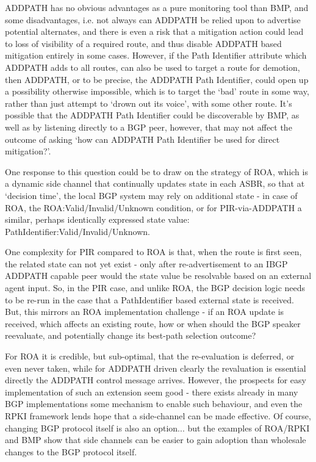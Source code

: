 ADDPATH has no obvious advantages as a pure monitoring tool than BMP, and some disadvantages, i.e. not always can ADDPATH be relied upon to advertise potential alternates, and there is even a risk that a mitigation action could lead to loss of visibility of a required route, and thus disable ADDPATH based mitigation entirely in some cases.  However, if the Path Identifier attribute which ADDPATH adds to all routes, can also be used to target a route for demotion, then ADDPATH, or to be precise, the ADDPATH Path Identifier, could open up a possibility otherwise impossible, which is to target the `bad' route in some way, rather than just attempt to `drown out its voice', with some other route.  It's possible that the ADDPATH Path Identifier could be discoverable by BMP, as well as by listening directly to a BGP peer, however, that may not affect the outcome of asking `how can ADDPATH Path Identifier be used for direct mitigation?'.

One response to this question could be to draw on the strategy of ROA, which is a dynamic side channel that continually updates state in each ASBR, so that at `decision time', the local BGP system may rely on additional state - in case of ROA, the ROA:Valid/Invalid/Unknown condition, or for PIR-via-ADDPATH a similar, perhaps identically expressed state value: PathIdentifier:Valid/Invalid/Unknown.

One complexity for PIR compared to ROA is that, when the route is first seen, the related state can not yet exist - only after re-advertisement to an IBGP ADDPATH capable peer would the state value be resolvable based on an external agent input.  So, in the PIR case, and unlike ROA, the BGP decision logic needs to be re-run in the case that a PathIdentifier based external state is received.  But, this mirrors an ROA implementation challenge - if an ROA update is received, which affects an existing route, how or when should the BGP speaker reevaluate, and potentially change its best-path selection outcome?

For ROA it is credible, but sub-optimal, that the re-evaluation is deferred, or even never taken, while for ADDPATH driven clearly the revaluation is essential directly the ADDPATH control message arrives.  However, the prospects for easy implementation of such an extension seem good - there exists already in many BGP implementations some mechanism to enable such behaviour, and even the RPKI framework lends hope that a side-channel can be made effective.  Of course, changing BGP protocol itself is also an option...  but the examples of ROA/RPKI and BMP show that side channels can be easier to gain adoption than wholesale changes to the BGP protocol itself.

